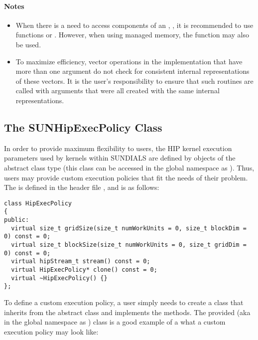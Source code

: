 \paragraph{\bf Notes}

\begin{itemize}

\item
  When there is a need to access components of an , ,
  it is recommended to use functions  or
  . However, when using managed memory, the
  function  may also be used.

\item
  {\warn}To maximize efficiency, vector operations in the {\nvechip} implementation
  that have more than one  argument do not check for
  consistent internal representations of these vectors. It is the user's
  responsibility to ensure that such routines are called with 
  arguments that were all created with the same internal representations.

\end{itemize}

\subsection{The SUNHipExecPolicy Class}\label{ss:sunhipexecpolicy}

In order to provide maximum flexibility to users, the HIP kernel execution parameters used
by kernels within SUNDIALS are defined by objects of the 
abstract class type (this class can be accessed in the global namespace as ).
Thus, users may provide custom execution policies that fit the needs of their problem. The
 is defined in the header file ,
and is as follows:

\begin{verbatim}
class HipExecPolicy
{
public:
  virtual size_t gridSize(size_t numWorkUnits = 0, size_t blockDim = 0) const = 0;
  virtual size_t blockSize(size_t numWorkUnits = 0, size_t gridDim = 0) const = 0;
  virtual hipStream_t stream() const = 0;
  virtual HipExecPolicy* clone() const = 0;
  virtual ~HipExecPolicy() {}
};
\end{verbatim}

To define a custom execution policy, a user simply needs to create a class that inherits from
the abstract class and implements the methods. The {\sundials} provided
 (aka in the global namespace as
) class is a good example of a what a custom execution policy
may look like:

